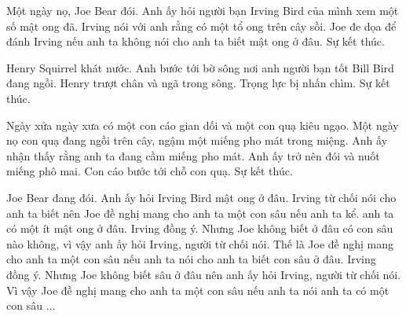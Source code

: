 \documentclass{article}
\begin{document}
\begin{huge}


Một ngày nọ, Joe Bear đói. Anh ấy hỏi người bạn Irving Bird của mình xem một số
mật ong đã. Irving nói với anh rằng có một tổ ong trên cây sồi. Joe đe dọa
để đánh Irving nếu anh ta không nói cho anh ta biết mật ong ở đâu. Sự kết thúc.

Henry Squirrel khát nước. Anh bước tới bờ sông nơi anh
người bạn tốt Bill Bird đang ngồi. Henry trượt chân và ngã trong
sông. Trọng lực bị nhấn chìm. Sự kết thúc.

Ngày xửa ngày xưa có một con cáo gian dối và một con quạ kiêu ngạo. Một ngày nọ
con quạ đang ngồi trên cây, ngậm một miếng pho mát trong miệng. Anh ấy
nhận thấy rằng anh ta đang cầm miếng pho mát. Anh ấy trở nên đói và
nuốt miếng phô mai. Con cáo bước tới chỗ con quạ. Sự kết thúc.


Joe Bear đang đói. Anh ấy hỏi Irving Bird mật ong ở đâu. Irving
từ chối nói cho anh ta biết nên Joe đề nghị mang cho anh ta một con sâu nếu anh ta kể.
anh ta có một ít mật ong ở đâu.  Irving đồng ý. Nhưng Joe không biết ở đâu
có con sâu nào không, vì vậy anh ấy hỏi Irving, người từ chối nói. Thế là Joe đề nghị
mang cho anh ta một con sâu nếu anh ta nói cho anh ta biết con sâu ở đâu.  Irving
đồng ý. Nhưng Joe không biết sâu ở đâu nên anh ấy hỏi Irving,
người từ chối nói. Vì vậy Joe đề nghị mang cho anh ta một con sâu nếu anh ta nói
anh ta có một con sâu $\ldots$ 


\end{huge}
\end{document}

